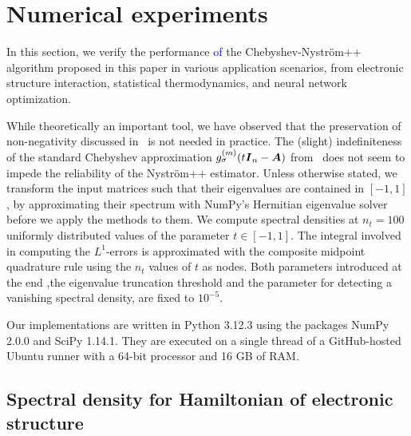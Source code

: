 
\section{Numerical experiments}
\label{sec:results}


In this section, we verify the performance \textcolor{blue}{of} the Chebyshev-Nyström++ algorithm proposed in this paper in various application scenarios, from electronic structure interaction, statistical thermodynamics, and neural network optimization.

While theoretically an important tool, we have observed that the preservation of non-negativity discussed in~ is not needed in practice. The (slight) indefiniteness of the standard Chebyshev approximation $g_{\sigma}^{(m)}(t \boldsymbol{I}_n - \boldsymbol{A})$ from~ does not seem to impede the reliability of the Nyström++ estimator. Unless otherwise stated, we transform the input matrices such that their eigenvalues are contained in $[-1, 1]$, by approximating their spectrum with NumPy's Hermitian eigenvalue solver before we apply the methods to them. We compute spectral densities at $n_t = 100$ uniformly distributed values of the parameter $t \in [-1, 1]$. The integral involved in computing the $L^1$-errors is approximated with the composite midpoint quadrature rule using the $n_t$ values of $t$ as nodes. Both parameters introduced at the end ,the eigenvalue truncation threshold and the parameter for detecting a vanishing spectral density, are fixed to $10^{-5}$.

Our implementations are written in Python 3.12.3 using the packages NumPy 2.0.0 and SciPy 1.14.1. They are executed on a single thread of a GitHub-hosted Ubuntu runner with a 64-bit processor and 16 GB of RAM. 

\subsection{Spectral density for Hamiltonian of electronic structure}
\label{subsec:hamiltonian}

